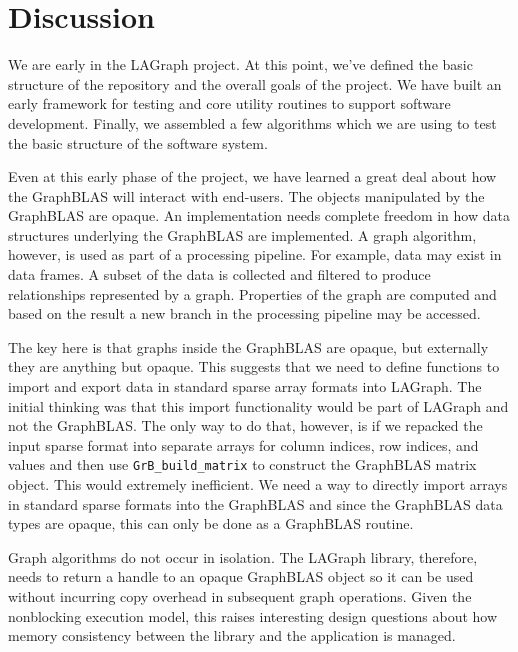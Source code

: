 \section{Discussion}
\label{sec:disc}

We are early in the LAGraph project.  At this point, we've defined the basic structure of the
repository and the overall goals of the project. We have built an early framework for testing
and core utility routines to support software development.  Finally, we assembled a few algorithms which we
are using to test the basic structure of the software system.

Even at this early phase of the project, we have learned a great deal about how the GraphBLAS
will interact with end-users.  The objects manipulated by the GraphBLAS are opaque.  An implementation
needs complete freedom in how data structures underlying the GraphBLAS are implemented.  
A graph algorithm, however, is used as part of a processing pipeline.  For example, data may
exist in data frames.  A subset of the data is collected and filtered to produce relationships
represented by a graph. Properties of the graph are computed and based on the result 
a new branch in the processing pipeline may be accessed.  

The key here is that graphs inside the GraphBLAS are opaque, but externally they are 
anything but opaque.  This suggests that we need to define functions to import and export 
data in standard sparse array formats into LAGraph.   The initial thinking was that this
import functionality would be part of LAGraph and not the GraphBLAS.  The only way to 
do that, however, is if we repacked the input sparse format into separate arrays for column 
indices, row indices, and values and then use \verb'GrB_build_matrix' to construct the GraphBLAS
matrix object.  This would extremely inefficient.  We need a way to directly import arrays 
in standard sparse formats into the GraphBLAS and since the GraphBLAS data types are
opaque, this can only be done as a GraphBLAS routine.  

Graph algorithms do not occur in isolation.   The LAGraph library, therefore, needs to 
return a handle to an opaque GraphBLAS object so it can be used without incurring copy overhead
in subsequent graph operations.  Given the nonblocking execution model, this raises interesting
design questions about how memory consistency between the library and the application is
managed.  

